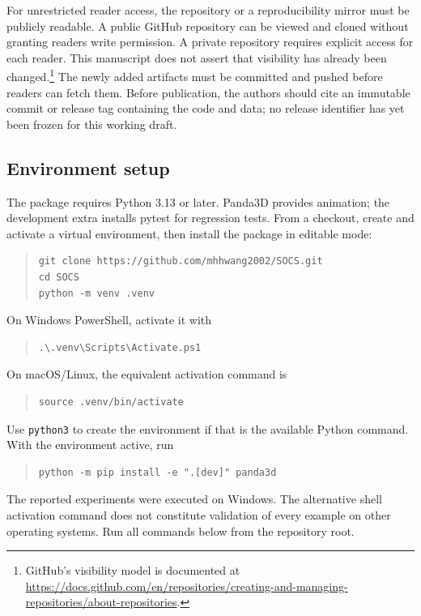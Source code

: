 \documentclass[11pt,a4paper]{article}
\theoremstyle{remark}
\begin{document}
For unrestricted reader access, the repository or a reproducibility mirror
must be publicly readable. A public GitHub repository can be viewed and
cloned without granting readers write permission. A private repository
requires explicit access for each reader. This manuscript does not assert
that visibility has already been changed.\footnote{GitHub's visibility
model is documented at
\url{https://docs.github.com/en/repositories/creating-and-managing-repositories/about-repositories}.}
The newly added artifacts must be committed and pushed before readers can
fetch them. Before publication, the authors should cite an immutable commit
or release tag containing the code and data; no release identifier has yet
been frozen for this working draft.

\subsection{Environment setup}
The package requires Python 3.13 or later. Panda3D provides animation;
the development extra installs pytest for regression tests. From a checkout,
create and activate a virtual environment, then install the package in
editable mode:
\begin{quote}\small
\begin{verbatim}
git clone https://github.com/mhhwang2002/SOCS.git
cd SOCS
python -m venv .venv
\end{verbatim}
\end{quote}
On Windows PowerShell, activate it with
\begin{quote}\small
\begin{verbatim}
.\.venv\Scripts\Activate.ps1
\end{verbatim}
\end{quote}
On macOS/Linux, the equivalent activation command is
\begin{quote}\small
\begin{verbatim}
source .venv/bin/activate
\end{verbatim}
\end{quote}
Use \nolinkurl{python3} to create the environment if that is the available
Python command. With the environment active, run
\begin{quote}\small
\begin{verbatim}
python -m pip install -e ".[dev]" panda3d
\end{verbatim}
\end{quote}
The reported experiments were executed on Windows. The alternative shell
activation command does not constitute validation of every example on other
operating systems. Run all commands below from the repository root.
\end{document}
